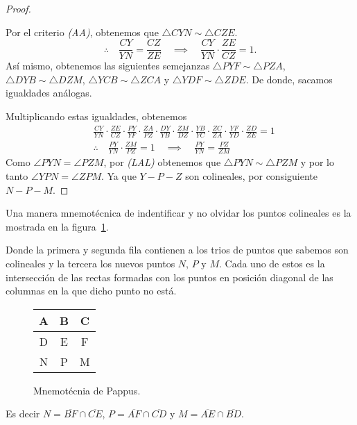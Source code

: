 \begin{proof}
    \begin{figure}[H]
        \centering
        
    \end{figure}

    Por el criterio \textit{(AA)}, obtenemos que $\triangle CYN \sim \triangle CZE$.
    \[
        \therefore  \quad \frac{CY}{YN} = \frac{CZ}{ZE} \quad \implies \quad \frac{CY}{YN} \cdot \frac{ZE}{CZ} = 1.
    \]
    Así mismo, obtenemos las siguientes semejanzas $\triangle PYF \sim \triangle PZA$, $\triangle DYB \sim \triangle DZM$, $\triangle YCB \sim \triangle ZCA$ y $\triangle YDF \sim \triangle ZDE$.
    De donde, sacamos igualdades análogas.

    Multiplicando estas igualdades, obtenemos
    \begin{align*}
        &\frac{CY}{YN} \cdot \frac{ZE}{CZ} \cdot \frac{PY}{YF} \cdot \frac{ZA}{PZ} \cdot \frac{DY}{YB} \cdot \frac{ZM}{DZ} \cdot \frac{YB}{YC} \cdot \frac{ZC}{ZA} \cdot \frac{YF}{YD} \cdot \frac{ZD}{ZE} = 1\\[3mm]
        &\therefore \quad \frac{PY}{YN} \cdot \frac{ZM}{PZ} = 1 \quad \implies \quad \frac{PY}{YN} = \frac{PZ}{ZM}
    \end{align*}
    Como $\angle PYN = \angle PZM$, por \textit{(LAL)} obtenemos que $\triangle PYN \sim \triangle PZM$ y por lo tanto $\angle YPN = \angle ZPM$.
    Ya que $Y - P - Z$ son colineales, por consiguiente $N - P - M$.
\end{proof}

\begin{remark.tcb}
    Una manera mnemotécnica de indentificar y no olvidar los puntos colineales es la mostrada en la figura~\ref{fig:pappus-mnemonic}.
    \begin{multicols}{2}
        Donde la primera y segunda fila contienen a los trios de puntos que sabemos son colineales y la tercera los nuevos puntos $N$, $P$ y $M$.
        Cada uno de estos es la intersección de las rectas formadas con los puntos en posición diagonal de las columnas en la que dicho punto no está.
        \begin{figure}[H]
            \centering
            \begin{tabular}{|c|c|c|}
                \hline
                A & B & C\\\hline
                D & E & F\\
                \hline \hline
                N & P & M\\
                \hline
            \end{tabular}
            \caption{Mnemotécnia de Pappus.}
            \label{fig:pappus-mnemonic}
        \end{figure}
        \vspace{-4mm}
        Es decir $N = \overline{BF} \cap \overline{CE}$, $P = \overline{AF} \cap \overline{CD}$ y $M = \overline{AE} \cap \overline{BD}$.
    \end{multicols}
\end{remark.tcb}


